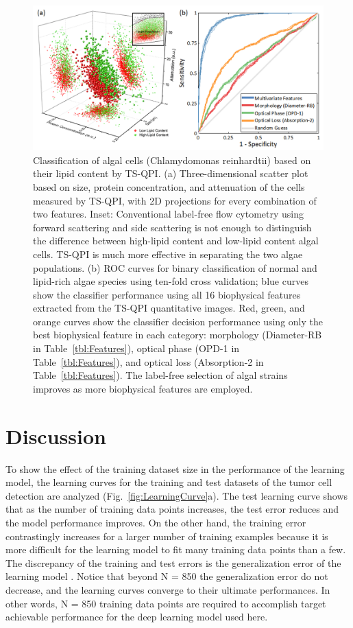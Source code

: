 \documentclass[aps,pra,reprint,longbibliography,superscriptaddress]{revtex4-1}
\begin{document}
\begin{figure}
\includegraphics[scale=0.8]{FigureAlgae.jpg}
\caption{\label{fig:AlgaeScatter} Classification of algal cells (Chlamydomonas reinhardtii) based on their lipid content by TS-QPI. (a) Three-dimensional scatter plot based on size, protein concentration, and attenuation of the cells measured by TS-QPI, with 2D projections for every combination of two features. Inset: Conventional label-free flow cytometry using forward scattering and side scattering is not enough to distinguish the difference between high-lipid content and low-lipid content algal cells. TS-QPI is much more effective in separating the two algae populations. (b) ROC curves for binary classification of normal and lipid-rich algae species using ten-fold cross validation; blue curves show the classifier performance using all 16 biophysical features extracted from the TS-QPI quantitative images. Red, green, and orange curves show the classifier decision performance using only the best biophysical feature in each category: morphology (Diameter-RB in Table~\ref{tbl:Features}), optical phase (OPD-1 in Table~\ref{tbl:Features}), and optical loss (Absorption-2 in Table~\ref{tbl:Features}). The label-free selection of algal strains improves as more biophysical features are employed.}
\end{figure}

\section{Discussion}

To show the effect of the training dataset size in the performance of the learning model, the learning curves for the training and test datasets of the tumor cell detection are analyzed (Fig.~\ref{fig:LearningCurve}a). The test learning curve shows that as the number of training data points increases, the test error reduces and the model performance improves. On the other hand, the training error contrastingly increases for a larger number of training examples because it is more difficult for the learning model to fit many training data points than a few. The discrepancy of the training and test errors is the generalization error of the learning model \cite{abu2012learning}. Notice that beyond N = 850 the generalization error do not decrease, and the learning curves converge to their ultimate performances. In other words, N = 850 training data points are required to accomplish target achievable performance for the deep learning model used here.
\end{document}
